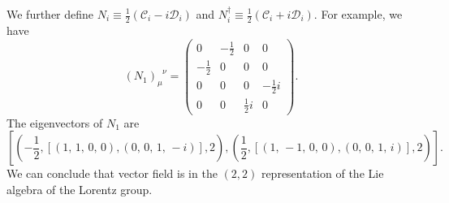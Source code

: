 We further define $N_i \equiv \frac{1}{2}(\mathcal{C}_i-i\mathcal{D}_i)$ and $N^{\dagger}_i \equiv \frac{1}{2}(\mathcal{C}_i + i \mathcal{D}_i)$. For example, we have
\[(N_1)_{\mu}^{\phantom{\mu}\nu} = \left(\begin{array}{rrrr}
0 & -\frac{1}{2} & 0 & 0 \\
-\frac{1}{2} & 0 & 0 & 0 \\
0 & 0 & 0 & -\frac{1}{2} i \\
0 & 0 & \frac{1}{2} i & 0
\end{array}\right).\]
The eigenvectors of $N_1$ are
\[\left[\left(-\frac{1}{2}, \left[\left(1,\,1,\,0,\,0\right),
\left(0,\,0,\,1,\,-i\right)\right], 2\right), \left(\frac{1}{2},
\left[\left(1,\,-1,\,0,\,0\right), \left(0,\,0,\,1,\,i\right)\right],
2\right)\right].\]
We can conclude that vector field is in the $(2,2)$ representation of the Lie algebra of the Lorentz group.

